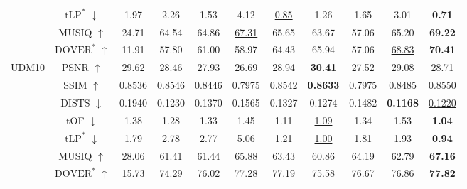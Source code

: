 \begin{table*}[t]
{\begin{tabular}{c|c|c|c|c|c|c|c|c|c|c}
                             & $\text{tLP}^*$ $\downarrow$     & 1.97       & 2.26    & 1.53          & 4.12            & \underline{0.85}    & 1.26            & 1.65            & 3.01            & \textbf{0.71}   \\ 
                             & MUSIQ $\uparrow$       & 24.71               & 64.54    & 64.86        & \underline{67.31}      & 65.65        & 63.67           & 57.06           & 65.20           & \textbf{69.22}  \\
                             & $\text{DOVER}^*$ $\uparrow$     & 11.91    & 57.80    & 61.00        & 58.97          & 64.43        & 65.94           & 57.06           & \underline{68.83}      & \textbf{70.41}  \\ \hline
    \multirow{7}{*}{UDM10}   & PSNR $\uparrow$        & \underline{29.62}   & 28.46    & 27.93        & 26.69           & 28.94        & \textbf{30.41}  & 27.52           & 29.08           & 28.71           \\
                             & SSIM $\uparrow$        & 0.8536              & 0.8546    & 0.8446      & 0.7975          & 0.8542       & \textbf{0.8633} & 0.7975          & 0.8485          & \underline{0.8550}     \\
                             & DISTS $\downarrow$     & 0.1940              & 0.1230    & 0.1370      & 0.1565          & 0.1327       & 0.1274          & 0.1482          & \textbf{0.1168} & \underline{0.1220}     \\
                             & tOF $\downarrow$       & 1.38                & 1.28     & 1.33         & 1.45           & 1.11         & \underline{1.09}      & 1.34           & 1.53           & \textbf{1.04}  \\
                             & $\text{tLP}^*$ $\downarrow$     & 1.79       & 2.78    & 2.77          & 5.06            & 1.21         & \underline{1.00}       & 1.81            & 1.93            & \textbf{0.94}   \\ 
                             & MUSIQ $\uparrow$       & 28.06               & 61.41    & 61.44        & \underline{65.88}      & 63.43        & 60.86           & 64.19           & 62.79           & \textbf{67.16}  \\                & $\text{DOVER}^*$ $\uparrow$     & 15.73      & 74.29   & 76.02        & \underline{77.28} & 77.19        & 75.58           & 76.67           & 76.86      & \textbf{77.82}  \\ \hline
                             

\end{tabular}}
\end{table*}
